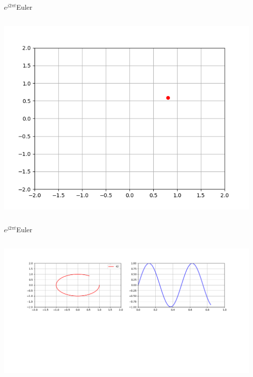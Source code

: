 \begin{frame}{$e^{j2\pi t}$}{Euler}
   \handsonicon
   \begin{columns}[onlytextwidth]
      
      \centering\includegraphics[width=1.0\textwidth]{2_clase/euler1}
   \end{columns}
   \vfill
\end{frame}
\begin{frame}{$e^{j2\pi t}$}{Euler}
   \handsonicon
   \begin{columns}[onlytextwidth]
      
      \centering\includegraphics[width=1.0\textwidth]{2_clase/euler2}
   \end{columns}
   \vfill
\end{frame}
